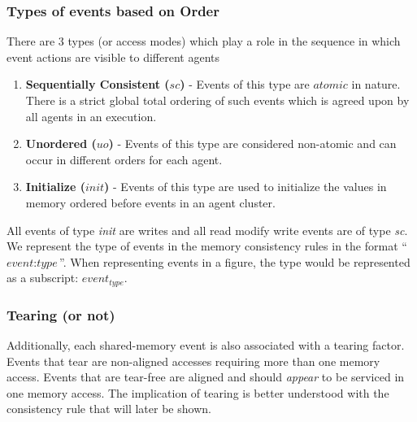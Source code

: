    \subsubsection{Types of events based on Order} 
        There are 3 types (or access modes) which play a role in the sequence in which event actions are visible to different agents
        \begin{enumerate}
            \item \textbf{Sequentially Consistent ($sc$)} - Events of this type are $atomic$ in nature. There is a strict global total ordering of such events which is agreed upon by all agents in an execution. 
            
            \item \textbf{Unordered ($uo$)} - Events of this type are considered non-atomic and can occur in different orders for each agent.
            
            \item \textbf{Initialize ($init$)} - Events of this type are used to initialize the values in memory ordered before events in an agent cluster.
        \end{enumerate}
        
        All events of type \textit{init} are writes and all read modify write events are of type \textit{sc}.
        We represent the type of events in the memory consistency rules in the format ``$\textit{event} : \textit{type}$''. 
        When representing events in a figure, the type would be represented as a subscript: $\textit{event}_\textit{type}$.
   
    \subsubsection{Tearing (or not)}
        Additionally, each shared-memory event is also associated with a tearing factor. 
        Events that tear are non-aligned accesses requiring more than one memory access. Events that are tear-free are aligned and should \textit{appear} to be serviced in one memory access. The implication of tearing is better understood with the consistency rule that will later be shown.